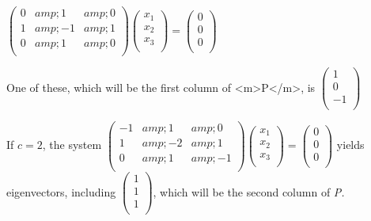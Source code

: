\(\left(
\begin{array}{ccc}
 0 &amp; 1 &amp; 0 \\
 1 &amp; -1 &amp; 1 \\
 0 &amp; 1 &amp; 0 \\
\end{array}
\right)\left(
\begin{array}{c}
 x_1 \\
 x_2 \\
 x_3 \\
\end{array}
\right)=\left(
\begin{array}{c}
 0 \\
 0 \\
 0 \\
\end{array}
\right)\) 



One of these, which will be the first column of <m>P</m>, is \(\left(
\begin{array}{c}
 1 \\
 0 \\
 -1 \\
\end{array}
\right)\)



If \(c=2\), the system \(\left(
\begin{array}{ccc}
 -1 &amp; 1 &amp; 0 \\
 1 &amp; -2 &amp; 1 \\
 0 &amp; 1 &amp; -1 \\
\end{array}
\right)\left(
\begin{array}{c}
 x_1 \\
 x_2 \\
 x_3 \\
\end{array}
\right)=\left(
\begin{array}{c}
 0 \\
 0 \\
 0 \\
\end{array}
\right)\)  yields eigenvectors, including \(\left(
\begin{array}{c}
 1 \\
 1 \\
 1 \\
\end{array}
\right)\), which will be the second column of \textit{ P.}



